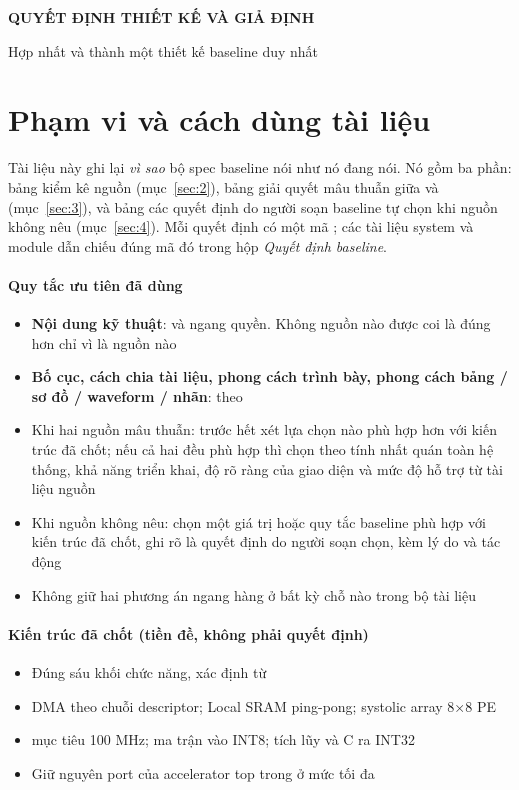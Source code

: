 \documentclass[10pt,a4paper]{article}
\begin{document}
{\Large\bfseries QUYẾT ĐỊNH THIẾT KẾ VÀ GIẢ ĐỊNH}\par
\vspace{2pt}
{\small\color{muted}Hợp nhất  và  thành một thiết kế baseline duy nhất}\par
\tableofcontents
\clearpage

\section{Phạm vi và cách dùng tài liệu}\label{sec:1}

\begin{keypoint}
Tài liệu này ghi lại \emph{vì sao} bộ spec baseline nói như nó đang nói. Nó gồm ba phần: bảng kiểm kê
nguồn (mục~\ref{sec:2}), bảng giải quyết mâu thuẫn giữa  và 
(mục~\ref{sec:3}), và bảng các quyết định do người soạn baseline tự chọn khi nguồn không nêu
(mục~\ref{sec:4}). Mỗi quyết định có một mã ; các tài liệu system và module dẫn chiếu
đúng mã đó trong hộp \emph{Quyết định baseline}.
\end{keypoint}

\paragraph{Quy tắc ưu tiên đã dùng}\label{par:1-1}
\begin{itemize}
\item \textbf{Nội dung kỹ thuật}:  và  ngang quyền. Không nguồn nào được coi là đúng hơn chỉ vì là nguồn nào
\item \textbf{Bố cục, cách chia tài liệu, phong cách trình bày, phong cách bảng / sơ đồ / waveform / nhãn}: theo 
\item Khi hai nguồn mâu thuẫn: trước hết xét lựa chọn nào phù hợp hơn với kiến trúc đã chốt; nếu cả hai đều phù hợp thì chọn theo tính nhất quán toàn hệ thống, khả năng triển khai, độ rõ ràng của giao diện và mức độ hỗ trợ từ tài liệu nguồn
\item Khi nguồn không nêu: chọn một giá trị hoặc quy tắc baseline phù hợp với kiến trúc đã chốt, ghi rõ là quyết định do người soạn chọn, kèm lý do và tác động
\item Không giữ hai phương án ngang hàng ở bất kỳ chỗ nào trong bộ tài liệu
\end{itemize}

\paragraph{Kiến trúc đã chốt (tiền đề, không phải quyết định)}\label{par:1-2}
\begin{itemize}
\item Đúng sáu khối chức năng, xác định từ 
\item DMA theo chuỗi descriptor; Local SRAM ping-pong; systolic array 8×8 PE
\item {} mục tiêu 100 MHz; ma trận vào INT8; tích lũy và C ra INT32
\item Giữ nguyên port của accelerator top trong  ở mức tối đa
\end{itemize}
\end{document}
